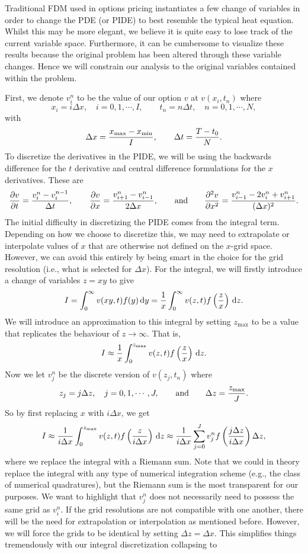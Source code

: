 Traditional FDM used in options pricing instantiates a few change of variables in order to change the PDE (or PIDE) to best resemble the typical heat equation. Whilst this may be more elegant, we believe it is quite easy to lose track of the current variable space. Furthermore, it can be cumbersome to visualize these results because the original problem has been altered through these variable changes. Hence we will constrain our analysis to the original variables contained within the problem.

First, we denote $v_i^n$ to be the value of our option $v$ at $v(x_i,t_n)$ where
	$$
		x_i = i\Delta x, \quad i = 0,1,\cdots,I,
		\qquad
		t_n = n\Delta t, \quad n = 0,1,\cdots,N,
	$$
with 
	$$
		\Delta x = \frac{x_{\text{max}}-x_{\text{min}}}{I}, \qquad \Delta t = \frac{T-t_0}{N}.
	$$
To discretize the derivatives in the PIDE, we will be using the backwards difference for the $t$ derivative and central difference formulations for the $x$ derivatives. These are
	$$
		\frac{\partial v}{\partial t} = \frac{v_i^n - v_i^{n-1}}{\Delta t},
		\qquad
		\frac{\partial v}{\partial x} = \frac{ v_{i+1}^n - v_{i-1}^n}{2\Delta x}, \qquad \text{and} \qquad
		\frac{\partial^2 v}{\partial x^2} = \frac{v_{i-1}^n - 2v_i^n + v_{i+1}^n}{(\Delta x)^2}.
	$$
The initial difficulty in discretizing the PIDE comes from the integral term. Depending on how we choose to discretize this, we may need to extrapolate or interpolate values of $x$ that are otherwise not defined on the $x$-grid space. However, we can avoid this entirely by being smart in the choice for the grid resolution (i.e., what is selected for $\Delta x$). For the integral, we will firstly introduce a change of variables $z = xy$ to give
	$$
		I = \int_0^\infty v(xy,t)f(y) \, \mathrm d y = \frac{1}{x}\int_0^\infty v(z,t)f\left(\frac{z}{x}\right) \, \mathrm d z.
	$$
We will introduce an approximation to this integral by setting $z_{\text{max}}$ to be a value that replicates the behaviour of $z \rightarrow \infty$. That is,
	$$
		I \approx  \frac{1}{x}\int_0^{z_\text{max}} v(z,t)f\left(\frac{z}{x}\right) \, \mathrm d z.
	$$
Now we let $v_j^n$ be the discrete version of $v(z_j,t_n)$ where
	$$
		z_j = j \Delta z, \quad j = 0,1,\cdots,J, \qquad \text{and} \qquad \Delta z = \frac{z_\text{max}}{J}.
	$$
So by first replacing $x$ with $i \Delta x$, we get
	$$
		I \approx  \frac{1}{i\Delta x}\int_0^{z_\text{max}} v(z,t)f\left(\frac{z}{i\Delta x}\right) \, \mathrm d z \approx  \frac{1}{i\Delta x}\sum\limits_{j=0}^J v_j^n f\left( \frac{j\Delta z}{i \Delta x} \right) \Delta z,
	$$
where we replace the integral with a Riemann sum. Note that we could in theory replace the integral with any type of numerical integration scheme (e.g., the class of numerical quadratures), but the Riemann sum is the most transparent for our purposes. We want to highlight that $v_j^n$ does not necessarily need to possess the same grid as $v_i^n$. If the grid resolutions are not compatible with one another, there will be the need for extrapolation or interpolation as mentioned before. However, we will force the grids to be identical by setting $\Delta z = \Delta x$. This simplifies things tremendously with our integral discretization collapsing to
